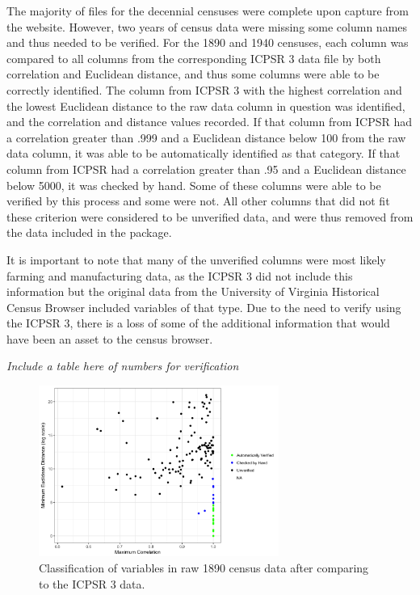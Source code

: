 \documentclass[11pt,]{article}
\begin{document}
The majority of files for the decennial censuses were complete upon
capture from the website. However, two years of census data were missing
some column names and thus needed to be verified. For the 1890 and 1940
censuses, each column was compared to all columns from the corresponding
ICPSR 3 data file by both correlation and Euclidean distance, and thus
some columns were able to be correctly identified. The column from ICPSR
3 with the highest correlation and the lowest Euclidean distance to the
raw data column in question was identified, and the correlation and
distance values recorded. If that column from ICPSR had a correlation
greater than .999 and a Euclidean distance below 100 from the raw data
column, it was able to be automatically identified as that category. If
that column from ICPSR had a correlation greater than .95 and a
Euclidean distance below 5000, it was checked by hand. Some of these
columns were able to be verified by this process and some were not. All
other columns that did not fit these criterion were considered to be
unverified data, and were thus removed from the data included in the
package.

It is important to note that many of the unverified columns were most
likely farming and manufacturing data, as the ICPSR 3 did not include
this information but the original data from the University of Virginia
Historical Census Browser included variables of that type. Due to the
need to verify using the ICPSR 3, there is a loss of some of the
additional information that would have been an asset to the census
browser.

\emph{Include a table here of numbers for verification }

\begin{figure}[htbp]
\centering
\includegraphics[width=0.70000\textwidth]{./figures/verification.png}
\caption{Classification of variables in raw 1890 census data after
comparing to the ICPSR 3 data.}
\end{figure}
\end{document}
